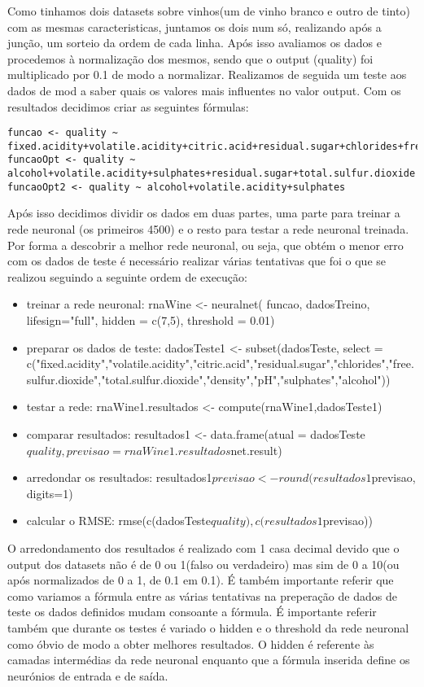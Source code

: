 \documentclass{article}
\begin{document}
{Como tinhamos dois datasets sobre vinhos(um de vinho branco e outro de tinto) com as mesmas caracteristicas, juntamos os dois num só, realizando após a junção, um sorteio da ordem de cada linha.
Após isso avaliamos os dados e procedemos à normalização dos mesmos, sendo que o output (quality) foi multiplicado por 0.1 de modo a normalizar.
Realizamos de seguida um teste aos dados de mod a saber quais os valores mais influentes no valor output. Com os resultados decidimos criar as seguintes fórmulas:
\begin{verbatim}
funcao <- quality ~ fixed.acidity+volatile.acidity+citric.acid+residual.sugar+chlorides+free.sulfur.dioxide+total.sulfur.dioxide+density+pH+sulphates+alcohol
funcaoOpt <- quality ~ alcohol+volatile.acidity+sulphates+residual.sugar+total.sulfur.dioxide
funcaoOpt2 <- quality ~ alcohol+volatile.acidity+sulphates
\end{verbatim}
Após isso decidimos dividir os dados em duas partes, uma parte para treinar a rede neuronal (os primeiros 4500) e o resto para testar a rede neuronal treinada.
Por forma a descobrir a melhor rede neuronal, ou seja, que obtém o menor erro com os dados de teste é necessário realizar várias tentativas que foi o que se realizou seguindo a seguinte ordem de execução:
\begin{itemize}
    \item treinar a rede neuronal: rnaWine <- neuralnet( funcao, dadosTreino, lifesign="full", hidden = c(7,5), threshold = 0.01)
    \item preparar os dados de teste: dadosTeste1 <- subset(dadosTeste, select = c("fixed.acidity","volatile.acidity","citric.acid","residual.sugar","chlorides","free.sulfur.dioxide","total.sulfur.dioxide","density","pH","sulphates","alcohol"))
    \item testar a rede: rnaWine1.resultados <- compute(rnaWine1,dadosTeste1)
    \item comparar resultados: resultados1 <- data.frame(atual = dadosTeste$quality, previsao = rnaWine1.resultados$net.result)
    \item arredondar os resultados: resultados1$previsao <- round(resultados1$previsao, digits=1)
    \item calcular o RMSE: rmse(c(dadosTeste$quality),c(resultados1$previsao))
\end{itemize}
O arredondamento dos resultados é realizado com 1 casa decimal devido que o output dos datasets não é de 0 ou 1(falso ou verdadeiro) mas sim de 0 a 10(ou após normalizados de 0 a 1, de 0.1 em 0.1).
É também importante referir que como variamos a fórmula entre as várias tentativas na preperação de dados de teste os dados definidos mudam consoante a fórmula. É importante referir também que durante os testes é variado o hidden e o threshold da rede neuronal como óbvio de modo a obter melhores resultados.
O hidden é referente às camadas intermédias da rede neuronal enquanto que a fórmula inserida define os neurónios de entrada e de saída.

}
\end{document}

